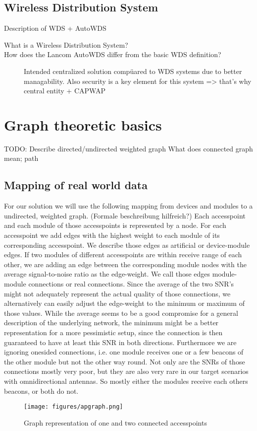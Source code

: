     \subsection{Wireless Distribution System}
    Description of WDS + AutoWDS \newline
      \begin{description}
       \item[What is a Wireless Distribution System?]
       \item[How does the Lancom AutoWDS differ from the basic WDS definition?]
	 Intended centralized solution compüared to WDS systems due to better managability.
	 Also security is a key element for this system => that's why central entity + CAPWAP
      \end{description}
\section{Graph theoretic basics}
  TODO: Describe directed/undirected weighted graph
  What does connected graph mean; path
   \subsection{Mapping of real world data}
    For our solution we will use the following mapping from devices and modules to a undirected, weighted graph. (Formale beschreibung hilfreich?)
    Each accesspoint and each module of those accesspoints is represented by a node.
    For each accesspoint we add edges with the highest weight to each module of its corresponding accesspoint. 
    We describe those edges as artificial or device-module edges.
    If two modules of different accesspoints are within receive range of each other, 
    we are adding an edge between the corresponding module nodes with the average signal-to-noise ratio as the edge-weight.
    We call those edges module-module connections or real connections.
    Since the average of the two SNR's might not adequately represent the actual quality of those connections,
    we alternatively can easily adjust the edge-weight to the minimum or maximum of those values.
    While the average seems to be a good compromise for a general description of the underlying network, the minimum might be a better representation for 
    a more pessimistic setup, since the connection is then guaranteed to have at least this SNR in both directions. 
    Furthermore we are ignoring onesided connections, i.e. one module receives one or a few beacons of the other module but not the other way round.
    Not only are the SNRs of those connections mostly very poor, but they are also very rare in our target scenarios with omnidirectional antennas.
    So mostly either the modules receive each others beacons, or both do not.
    \begin{figure}[t]
      \centering
      \texttt{[image: figures/apgraph.png]}
      \caption{Graph representation of one and two connected accesspoints}
      \label{fig:apgraph}
    \end{figure}
